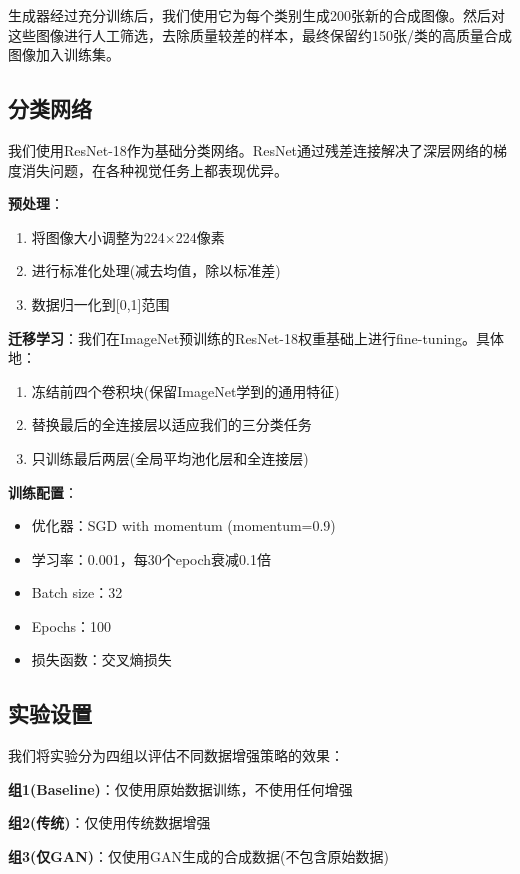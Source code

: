 \documentclass[supercite]{../Hust-undergraduate-translation/Experimental_Report}
\theoremstyle{definition}
\begin{document}
生成器经过充分训练后，我们使用它为每个类别生成200张新的合成图像。然后对这些图像进行人工筛选，去除质量较差的样本，最终保留约150张/类的高质量合成图像加入训练集。

\subsection{分类网络}

我们使用ResNet-18作为基础分类网络。ResNet通过残差连接解决了深层网络的梯度消失问题，在各种视觉任务上都表现优异。

\textbf{预处理}：
\begin{enumerate}
\item 将图像大小调整为224$\times$224像素
\item 进行标准化处理(减去均值，除以标准差)
\item 数据归一化到[0,1]范围
\end{enumerate}

\textbf{迁移学习}：我们在ImageNet预训练的ResNet-18权重基础上进行fine-tuning。具体地：
\begin{enumerate}
\item 冻结前四个卷积块(保留ImageNet学到的通用特征)
\item 替换最后的全连接层以适应我们的三分类任务
\item 只训练最后两层(全局平均池化层和全连接层)
\end{enumerate}

\textbf{训练配置}：
\begin{itemize}
\item 优化器：SGD with momentum (momentum=0.9)
\item 学习率：0.001，每30个epoch衰减0.1倍
\item Batch size：32
\item Epochs：100
\item 损失函数：交叉熵损失
\end{itemize}

\subsection{实验设置}

我们将实验分为四组以评估不同数据增强策略的效果：

\textbf{组1(Baseline)}：仅使用原始数据训练，不使用任何增强

\textbf{组2(传统)}：仅使用传统数据增强

\textbf{组3(仅GAN)}：仅使用GAN生成的合成数据(不包含原始数据)
\end{document}
